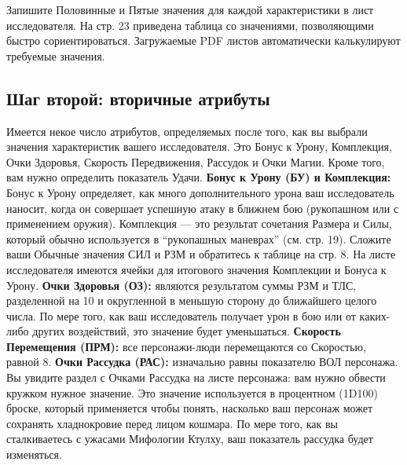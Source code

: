 \documentclass[letterpaper,twocolumn,openany, twoside, 11pt, usenames]{cocbook}
\begin{document}
Запишите Половинные и Пятые значения для каждой характеристики в лист исследователя. На стр. 23 приведена таблица со значениями, позволяющими быстро сориентироваться. Загружаемые PDF листов автоматически калькулируют требуемые значения.

\subsection*{Шаг второй: вторичные атрибуты}

Имеется некое число атрибутов, определяемых после того, как вы выбрали значения характеристик вашего исследователя. Это Бонус к Урону, Комплекция, Очки Здоровья, Скорость Передвижения, Рассудок и Очки Магии. Кроме того, вам нужно определить показатель Удачи.
\smallbreak
\noindent \textbf{Бонус к Урону (БУ) и Комплекция:} Бонус к Урону определяет, как много дополнительного урона ваш исследователь наносит, когда он совершает успешную атаку в ближнем бою (рукопашном или с применением оружия). Комплекция --- это результат сочетания Размера и Силы, который обычно используется в ``рукопашных маневрах'' (см. стр. 19). Сложите ваши Обычные значения СИЛ и РЗМ и обратитесь к таблице на стр. 8. На листе исследователя имеются ячейки для итогового значения Комплекции и Бонуса к Урону.
\smallbreak
\noindent \textbf{Очки Здоровья (ОЗ):} являются результатом суммы РЗМ и ТЛС, разделенной на 10 и округленной в меньшую сторону до ближайшего целого числа. По мере того, как ваш исследователь получает урон в бою или от каких-либо других воздействий, это значение будет уменьшаться.
\smallbreak
\noindent {}
\smallbreak
\noindent \textbf{Скорость Перемещения (ПРМ):} все персонажи-люди перемещаются со Скоростью, равной 8.
\smallbreak
\noindent \textbf{Очки Рассудка (РАС):} изначально равны показателю ВОЛ персонажа. Вы увидите раздел с Очками Рассудка на листе персонажа: вам нужно обвести кружком нужное значение. Это значение используется в процентном (1D100) броске, который применяется чтобы понять, насколько ваш персонаж может сохранять хладнокровие перед лицом кошмара. По мере того, как вы сталкиваетесь с ужасами Мифологии Ктулху, ваш показатель рассудка будет изменяться.
\smallbreak
\noindent {}
\end{document}
